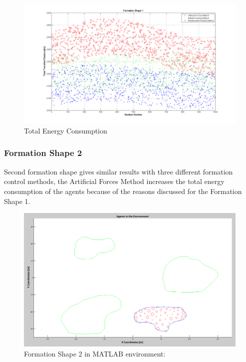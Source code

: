 \documentclass[twoside]{article}
\begin{document}
		\begin{figure}[H]
			\caption{Total Energy Consumption}
			\centerline{\includegraphics[scale = 0.35]{Total_Energy_Shape_1}}
		\end{figure} 	
		
		
		
		
		   \subsubsection{Formation Shape 2}
Second formation shape gives similar results with three different formation control methods, the Artificial Forces Method increases the total energy consumption of the agents because of the reasons discussed for the Formation Shape 1.

		   \begin{figure}[H]
		   	\caption{Formation Shape 2 in MATLAB environment:}
		   	\centerline{\includegraphics[scale = 0.40]{Trajectories_Formation_Shape_2_2}}
		   \end{figure} 	
		   
\end{document}

